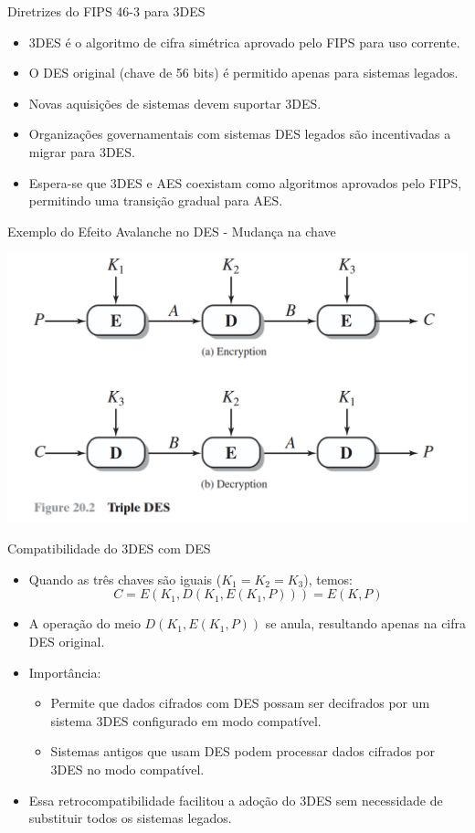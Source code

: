 \begin{frame}{Diretrizes do FIPS 46-3 para 3DES}
    \begin{itemize}
        \item 3DES é o algoritmo de cifra simétrica aprovado pelo FIPS para uso corrente.
        \item O DES original (chave de 56 bits) é permitido apenas para sistemas legados.
        \item Novas aquisições de sistemas devem suportar 3DES.
        \item Organizações governamentais com sistemas DES legados são incentivadas a migrar para 3DES.
        \item Espera-se que 3DES e AES coexistam como algoritmos aprovados pelo FIPS, permitindo uma transição gradual para AES.
    \end{itemize}
\end{frame}


\begin{frame}{Exemplo do Efeito Avalanche no DES - Mudança na chave}


    \centering
    \includegraphics[width=0.9\linewidth]{Figuras/3des-ede.png}

\end{frame}

\begin{frame}{Compatibilidade do 3DES com DES}
    \begin{itemize}
        \item Quando as três chaves são iguais ($K_1 = K_2 = K_3$), temos:
              \[
                  C = E(K_1, D(K_1, E(K_1, P))) = E(K, P)
              \]
        \item A operação do meio $D(K_1, E(K_1, P))$ se anula, resultando apenas na cifra DES original.
        \item Importância:
              \begin{itemize}
                  \item Permite que dados cifrados com DES possam ser decifrados por um sistema 3DES configurado em modo compatível.
                  \item Sistemas antigos que usam DES podem processar dados cifrados por 3DES no modo compatível.
              \end{itemize}
        \item Essa retrocompatibilidade facilitou a adoção do 3DES sem necessidade de substituir todos os sistemas legados.
    \end{itemize}
\end{frame}


